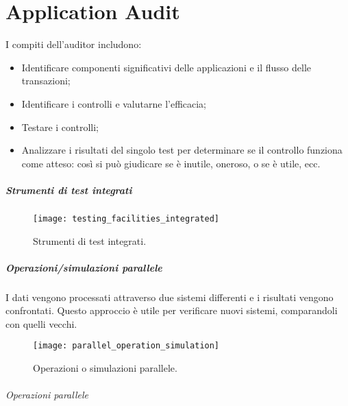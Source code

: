 \chapter{Application Audit}
\label{cs:aa}

I compiti dell'auditor includono:
\begin{itemize}
\item Identificare componenti significativi delle applicazioni e 
il flusso delle transazioni;
\item Identificare i controlli e valutarne l'efficacia;
\item Testare i controlli;
\item Analizzare i risultati del singolo test per determinare se 
il controllo funziona come atteso: così si può giudicare se è inutile,
oneroso, o se è utile, ecc.
\end{itemize}

\paragraph*{Strumenti di test integrati}

\begin{figure}[h!]
        \begin{center}
                \texttt{[image: testing\_facilities\_integrated]}
        \end{center}
        \caption{Strumenti di test integrati.}
        \label{fig:testing:facilities:integrated}
\end{figure}

\paragraph*{Operazioni/simulazioni parallele}

I dati vengono processati attraverso due sistemi differenti e i risultati vengono confrontati.
Questo approccio è utile per verificare nuovi sistemi, comparandoli con quelli vecchi.

\begin{figure}[h!]
        \begin{center}
                \texttt{[image: parallel\_operation\_simulation]}
        \end{center}
        \caption{Operazioni o simulazioni parallele.}
        \label{fig:testing:facilities:parallel}
\end{figure}

\subparagraph*{Operazioni parallele}

